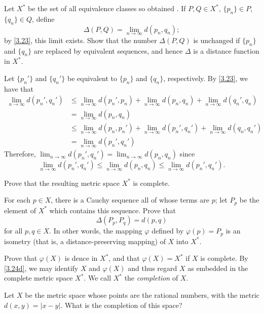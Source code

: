 \begin{exercise}
\begin{exercise}[label = (\alph*), ref = \arabic{exercisei} (\alph*)]
    Let \(X^*\) be the set of all equivalence classes so obtained .
    If \(P,Q\in X^*\), \(\{p_n\}\in P\), \(\{q_n\}\in Q\), define
    \[
    \Delta(P,Q) = \lim_{n\to\infty} d(p_n, q_n);
    \]
    by \cref{3.23}, this limit exists.
    Show that the number \(\Delta(P,Q)\) is unchanged if \(\{p_n\}\) and
    \(\{q_n\}\) are replaced by equivalent sequences, and hence \(\Delta\)
    is a distance function in \(X^*\).
    \par\smallskip
    Let \(\{p_n'\}\) and \(\{q_n'\}\) be equivalent to \(\{p_n\}\) and
    \(\{q_n\}\), respectively.
    By \cref{3.23}, we have that
    \begin{align*}
      \lim_{n\to\infty}d(p_n', q_n')
      & \leq \lim_{n\to\infty}d(p_n', p_n) + \lim_{n\to\infty}d(p_n, q_n) +
        \lim_{n\to\infty}d(q_n', q_n)\\
      & = \lim_{n\to\infty}d(p_n, q_n)\\
      & \leq \lim_{n\to\infty}d(p_n, p_n') + \lim_{n\to\infty}d(p_n', q_n') +
        \lim_{n\to\infty}d(q_n, q_n')\\
      & = \lim_{n\to\infty}d(p_n', q_n')
    \end{align*}
    Therefore, \(\lim_{n\to\infty}d(p_n',q_n') = \lim_{n\to\infty}d(p_n,q_n)\)
    since
    \[
    \lim_{n\to\infty}d(p_n', q_n')\leq\lim_{n\to\infty}d(p_n, q_n)\leq
    \lim_{n\to\infty}d(p_n', q_n').
    \]
  \item
    Prove that the resulting metric space \(X^*\) is complete.
  \item
    \label{3.24d}
    For each \(p\in X\), there is a Cauchy sequence all of whose terms are
    \(p\); let \(P_p\) be the element of \(X^*\) which contains this sequence.
    Prove that
    \[
    \Delta(P_p, P_q) = d(p, q)
    \]
    for all \(p,q\in X\).
    In other words, the mapping \(\varphi\) defined by \(\varphi(p) = P_p\) is
    an isometry (that is, a distance-preserving mapping) of \(X\) into \(X^*\).
  \item
    Prove that \(\varphi(X)\) is dence in \(X^*\), and that
    \(\varphi(X) = X^*\) if \(X\) is complete.
    By \cref{3.24d}, we may identify \(X\) and \(\varphi(X)\) and thus regard
    \(X\) as embedded in the complete metric space \(X^*\).
    We call \(X^*\) the \textit{completion} of \(X\).
  \end{exercise}
\item
  Let \(X\) be the metric space whose points are the rational numbers, with the
  metric \(d(x,y) = \lvert x - y\rvert\).
  What is the completion of this space?
\end{exercise}
